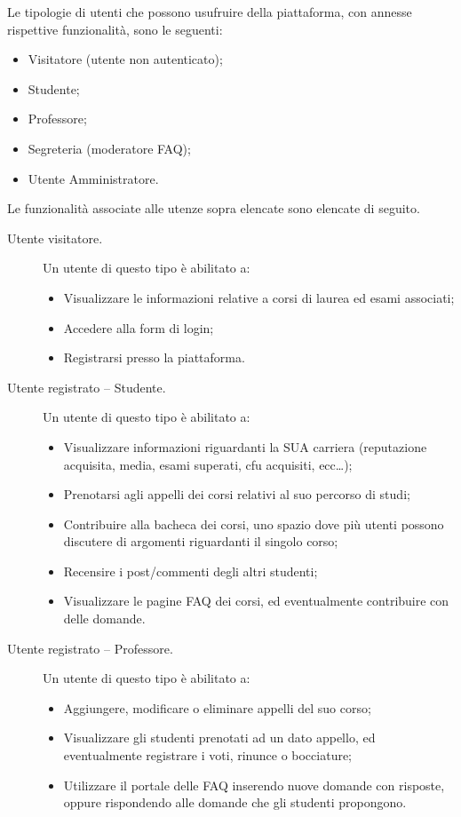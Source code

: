 \documentclass [a4paper,11pt]{book}
\begin{document}
Le tipologie di utenti che possono usufruire della piattaforma, con annesse rispettive funzionalità, sono le seguenti:
\begin{itemize}
\item Visitatore (utente non autenticato);
\item Studente;
\item Professore;
\item Segreteria (moderatore FAQ);
\item Utente Amministratore.
\end{itemize}

\medskip
\medskip
\medskip

Le funzionalità associate alle utenze sopra elencate sono elencate di seguito.
\begin{description}
\item[Utente visitatore.] Un utente di questo tipo è abilitato a:

\begin{itemize}
\item Visualizzare le informazioni relative a corsi di laurea ed esami associati;
\item Accedere alla form di login;
\item Registrarsi presso la piattaforma.
\end{itemize}

\item[Utente registrato – Studente.] Un utente di questo tipo è abilitato a:

\begin{itemize}
\item Visualizzare informazioni riguardanti la SUA carriera (reputazione acquisita, media, esami superati, cfu acquisiti, ecc…);
\item Prenotarsi agli appelli dei corsi relativi al suo percorso di studi;
\item Contribuire alla bacheca dei corsi, uno spazio dove più utenti possono discutere di argomenti riguardanti il singolo corso;
\item Recensire i post/commenti degli altri studenti;
\item Visualizzare le pagine FAQ dei corsi, ed eventualmente contribuire con delle domande.
\end{itemize}

\item[Utente registrato – Professore.] Un utente di questo tipo è abilitato a:

\begin{itemize}
\item Aggiungere, modificare o eliminare appelli del suo corso;
\item Visualizzare gli studenti prenotati ad un dato appello, ed eventualmente registrare i voti, rinunce o bocciature;
\item Utilizzare il portale delle FAQ inserendo nuove domande con risposte, oppure rispondendo alle domande che gli studenti propongono.
\end{itemize}


\end{description}
\end{document}
